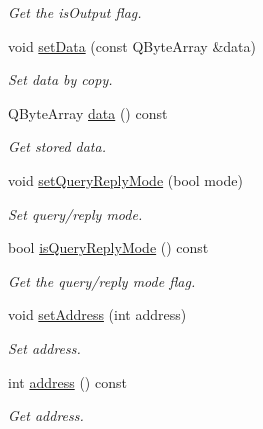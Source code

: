 \begin{DoxyCompactItemize}
\begin{DoxyCompactList}\small\item\em Get the isOutput flag. \end{DoxyCompactList}\item 
\hypertarget{classmdt_port_transaction_a9487e13f95c553cead6e2043573615d9}{
void \hyperlink{classmdt_port_transaction_a9487e13f95c553cead6e2043573615d9}{setData} (const QByteArray \&data)}
\label{classmdt_port_transaction_a9487e13f95c553cead6e2043573615d9}

\begin{DoxyCompactList}\small\item\em Set data by copy. \end{DoxyCompactList}\item 
\hypertarget{classmdt_port_transaction_a2b4f95dae82de8853e12138b4db616a0}{
QByteArray \hyperlink{classmdt_port_transaction_a2b4f95dae82de8853e12138b4db616a0}{data} () const }
\label{classmdt_port_transaction_a2b4f95dae82de8853e12138b4db616a0}

\begin{DoxyCompactList}\small\item\em Get stored data. \end{DoxyCompactList}\item 
void \hyperlink{classmdt_port_transaction_a6bd68a89059c790f475b8ff78c943656}{setQueryReplyMode} (bool mode)
\begin{DoxyCompactList}\small\item\em Set query/reply mode. \end{DoxyCompactList}\item 
bool \hyperlink{classmdt_port_transaction_a9da1cc7a191cd21a2e532d277aa3c628}{isQueryReplyMode} () const 
\begin{DoxyCompactList}\small\item\em Get the query/reply mode flag. \end{DoxyCompactList}\item 
\hypertarget{classmdt_port_transaction_a7f43ee802c0dee3ee77b45188378f86e}{
void \hyperlink{classmdt_port_transaction_a7f43ee802c0dee3ee77b45188378f86e}{setAddress} (int address)}
\label{classmdt_port_transaction_a7f43ee802c0dee3ee77b45188378f86e}

\begin{DoxyCompactList}\small\item\em Set address. \end{DoxyCompactList}\item 
\hypertarget{classmdt_port_transaction_a0c454829c2d1c2ea1b8bcc9797b2d46b}{
int \hyperlink{classmdt_port_transaction_a0c454829c2d1c2ea1b8bcc9797b2d46b}{address} () const }
\label{classmdt_port_transaction_a0c454829c2d1c2ea1b8bcc9797b2d46b}

\begin{DoxyCompactList}\small\item\em Get address. \end{DoxyCompactList}\end{DoxyCompactItemize}



